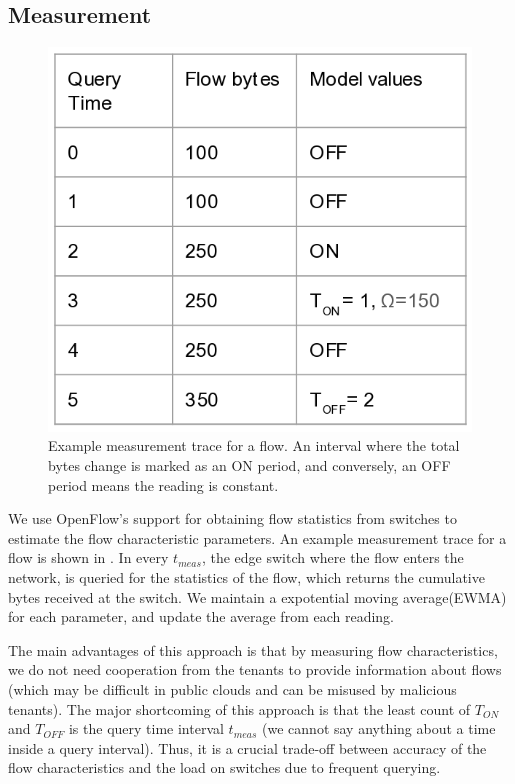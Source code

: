 \subsection{Measurement}
\begin{figure}[h!]
	\centering
	\includegraphics[width=\columnwidth]{meastrace.png}
	\caption{Example measurement trace for a flow. An interval where the total bytes change 
		is marked as an ON period, and conversely, an OFF period means the reading is constant.}
	\label{fig:meastrace}
\end{figure}
We use OpenFlow's support for obtaining flow statistics from 
switches to estimate the flow characteristic parameters. An example
measurement trace for a flow is shown in . In
every $t_{meas}$, the edge switch where the flow enters the network,
 is queried for the statistics of the 
flow, which returns the cumulative bytes received at the switch. We maintain
a expotential moving average(EWMA) for each parameter, and update the average
from each reading. 

The main advantages of this approach is that by measuring flow
characteristics, we do not need cooperation from the tenants to provide information about
flows (which may be difficult in public clouds and can be misused by malicious tenants). The 
major shortcoming of this approach is that the least count of $T_{ON}$ and $T_{OFF}$ is
the query time interval $t_{meas}$ (we cannot say anything about a time inside a query interval).
Thus, it is a crucial trade-off between accuracy of the flow characteristics and the load on switches
due to frequent querying. 

